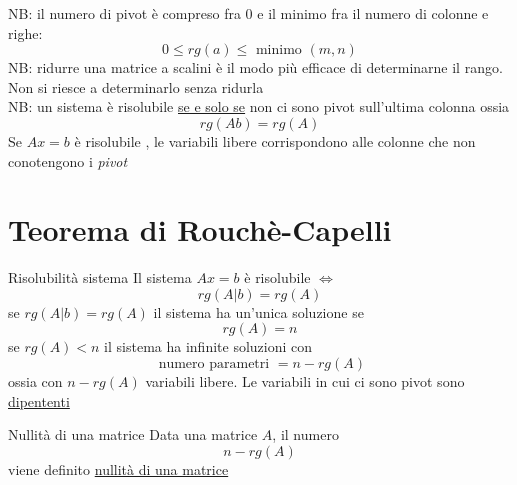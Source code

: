 NB: il numero di pivot è compreso fra 0 e il minimo fra il numero di colonne e righe:
\[
	0 \le rg\left( a \right) \le \text{ minimo }\left( m,n \right)
\]
NB: ridurre una matrice a scalini è il modo più efficace di determinarne il rango. Non si riesce a determinarlo senza ridurla\\
NB: un sistema è risolubile \underline{se e solo se} non ci sono pivot sull'ultima colonna ossia \[
	rg\left( Ab \right) = rg\left( A \right)
\]
Se $Ax = b$ è risolubile , le variabili libere corrispondono alle colonne che non conotengono i \textit{pivot}
\section{Teorema di Rouchè-Capelli}

\begin{teorema}{Risolubilità sistema}
	Il sistema $Ax = b$ è risolubile $\Leftrightarrow$ \[
		rg\left( A|b \right) =rg\left( A \right)
	\]
	se $rg\left( A|b \right) =rg\left( A \right) $ il sistema ha un'unica soluzione se \[
		rg\left( A \right) = n
	\]
	se  $rg\left( A\right) < n$ il sistema ha infinite soluzioni con \[
		\text{ numero parametri }= n- rg\left( A \right)
	\]
	ossia con $n-rg\left( A \right) $ variabili libere. Le variabili in cui ci sono pivot sono \underline{dipententi}
\end{teorema}

\begin{definizione}{Nullità di una matrice}
	Data una matrice $A$, il numero  \[
		n-rg\left( A \right)
	\]
	viene definito \underline{nullità di una matrice}
\end{definizione}

